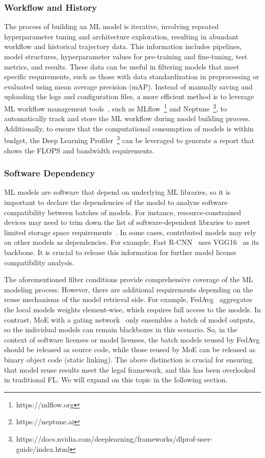 \subsubsection{Workflow and History}
\label{sec:workflow&history}
The process of building an ML model is iterative, involving repeated hyperparameter tuning and architecture exploration, resulting in abundant workflow and historical trajectory data.
This information includes pipelines, model structures, hyperparameter values for pre-training and fine-tuning, test metrics, and results. 
These data can be useful in filtering models that meet specific requirements, such as those with data standardization in preprocessing or evaluated using mean average precision (mAP).
Instead of manually saving and uploading the logs and configuration files, a more efficient method is to leverage ML workflow management tools~\cite{vartak2016modeldb}, such as MLflow~\footnote{https://mlflow.org} and Neptune~\footnote{https://neptune.ai}, to automatically track and store the ML workflow during model building process. 
Additionally, to ensure that the computational consumption of models is within budget, the Deep Learning Profiler~\footnote{https://docs.nvidia.com/deeplearning/frameworks/dlprof-user-guide/index.html} can be leveraged to generate a report that shows the FLOPS and bandwidth requirements.

\subsubsection{Software Dependency}
ML models are software that depend on underlying ML libraries, so it is important to declare the dependencies of the model to analyze software compatibility between batches of models. 
For instance, resource-constrained devices may need to trim down the list of software-dependent libraries to meet limited storage space requirements~\cite{david2021tensorflow}.
In some cases, contributed models may rely on other models as dependencies. 
For example, Fast R-CNN~\cite{girshick2015fast} uses VGG16~\cite{simonyan2014very} as its backbone. 
It is crucial to release this information for further model license compatibility analysis.

The aforementioned filter conditions provide comprehensive coverage of the ML modeling process. 
However, there are additional requirements depending on the reuse mechanisms of the model retrieval side. 
For example, FedAvg~\cite{mcmahan2017communication} aggregates the local models weights element-wise, which requires full access to the models. 
In contrast, MoE with a gating network~\cite{jacobs1991adaptive} only ensembles a batch of model outputs, so the individual models can remain blackboxes in this scenario.
So, in the context of software licenses or model licenses, the batch models reused by FedAvg should be released as source code, while those reused by MoE can be released as binary object code (static linking).
The above distinction is crucial for ensuring that model reuse results meet the legal framework, and this has been overlooked in traditional FL.
We will expand on this topic in the following section.

